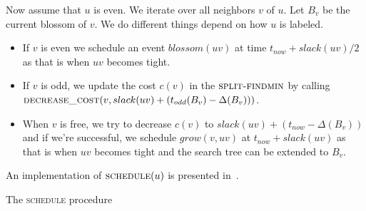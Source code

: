 Now assume that $u$ is even. We iterate over all neighbors $v$ of $u$. Let $B_v$ be the current blossom of 
$v$. We do different things depend on how $u$ is labeled.
\begin{itemize}
    \item If $v$ is even we schedule an event $blossom(uv)$ at time $t_{now} + slack(uv)/2$ as that is when $uv$ becomes tight.
    \item If $v$ is odd, we update the cost $c(v)$ in the $\textsc{split-findmin}$ by calling $\textsc{decrease\_cost}(v, slack(uv) + (t_{odd}(B_v) - \Delta(B_v)))$.
    \item When $v$ is free, we try to decrease $c(v)$ to $slack(uv) + (t_{now} - \Delta(B_v))$ and if we're successful, we schedule $grow(v, uv)$ at $t_{now} + slack(uv)$ as that is when $uv$ becomes tight and the search tree can be extended to $B_v$.
\end{itemize}

An implementation of $\textsc{schedule}(u)$ is presented in~.

\begin{algorithm}
\caption{The \textsc{schedule} procedure}\label{alg:schedule}
\begin{algorithmic}[1]
    \EndIf
    \Else
    \EndIf
\Else {}
        \EndIf
        \Else
            \EndIf
        \EndIf
    \EndFor
\EndIf
\EndProcedure
\end{algorithmic}
\end{algorithm}

